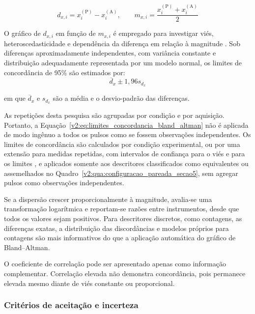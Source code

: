 \begin{equation}
	d_{x,i} = x_i^{(\mathrm{P})} - x_i^{(\mathrm{A})}, \qquad m_{x,i} = \frac{x_i^{(\mathrm{P})} + x_i^{(\mathrm{A})}}{2}
	\label{v2:eq:bland_altman_diferenca_media}
\end{equation}

O gráfico de \(d_{x,i}\) em função de \(m_{x,i}\) é empregado para investigar viés, heteroscedasticidade e dependência da diferença em relação à magnitude \cite{bland1986}. Sob diferenças aproximadamente independentes, com variância constante e distribuição adequadamente representada por um modelo normal, os limites de concordância de 95\% são estimados por:
\begin{equation}
	\overline{d}_x \pm 1{,}96s_{d_x}
	\label{v2:eq:limites_concordancia_bland_altman}
\end{equation}

\noindent
em que \(\overline{d}_x\) e \(s_{d_x}\) são a média e o desvio-padrão das diferenças.

As repetições desta pesquisa são agrupadas por condição e por aquisição. Portanto, a Equação~\eqref{v2:eq:limites_concordancia_bland_altman} não é aplicada de modo ingênuo a todos os pulsos como se fossem observações independentes. Os limites de concordância são calculados por condição experimental, ou por uma extensão para medidas repetidas, com intervalos de confiança para o viés e para os limites \cite{bland1999}, e aplicados somente aos descritores classificados como equivalentes ou assemelhados no Quadro~\ref{v2:qua:configuracao_pareada_secao5}, sem agregar pulsos como observações independentes.

Se a dispersão crescer proporcionalmente à magnitude, avalia-se uma transformação logarítmica e reportam-se razões entre instrumentos, desde que todos os valores sejam positivos. Para descritores discretos, como contagens, as diferenças exatas, a distribuição das discordâncias e modelos próprios para contagens são mais informativos do que a aplicação automática do gráfico de Bland--Altman.

O coeficiente de correlação pode ser apresentado apenas como informação complementar. Correlação elevada não demonstra concordância, pois permanece elevada mesmo diante de viés constante ou proporcional.

\subsubsection{Critérios de aceitação e incerteza}
\label{v2:subsec:criterios_aceitacao_incerteza}

